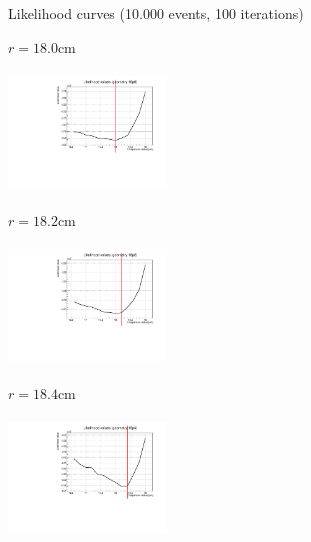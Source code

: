 \documentclass[8 pt]{beamer}
\begin{document}
\begin{frame}{Likelihood curves (10.000 events, 100 iterations)}
\justifying
\begin{minipage}[c]{.32\textwidth}
\begin{exampleblock}{} \begin{center}$r = 18.0$cm\end{center} \end{exampleblock}
\includegraphics[width=4.2cm, height=3.2cm]{figs/likelihood100LowStat/likelihood18p0.pdf} 
\end{minipage}
\begin{minipage}[c]{.32\textwidth}
\begin{exampleblock}{} \begin{center}$r = 18.2$cm\end{center} \end{exampleblock}
\includegraphics[width=4.2cm, height=3.2cm]{figs/likelihood100LowStat/likelihood18p2.pdf} 
\end{minipage}
\begin{minipage}[c]{.32\textwidth}
\begin{exampleblock}{} \begin{center}$r = 18.4$cm\end{center} \end{exampleblock}
\includegraphics[width=4.2cm, height=3.2cm]{figs/likelihood100LowStat/likelihood18p4.pdf} 
\end{minipage}


\end{frame}
\end{document}
